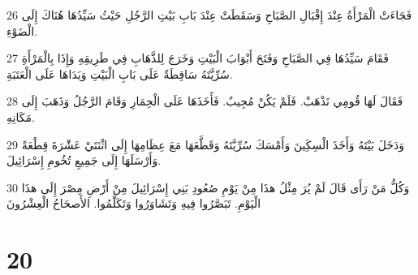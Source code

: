 \par 26 فَجَاءَتْ الْمَرْأَةُ عِنْدَ إِقْبَالِ الصَّبَاحِ وَسَقَطَتْ عِنْدَ بَابِ بَيْتِ الرَّجُلِ حَيْثُ سَيِّدُهَا هُنَاكَ إِلَى الْضَوْءِ.
\par 27 فَقَامَ سَيِّدُهَا فِي الصَّبَاحِ وَفَتَحَ أَبْوَابَ الْبَيْتِ وَخَرَجَ لِلذَّهَابِ فِي طَرِيقِهِ وَإِذَا بِالْمَرْأَةِ سُرِّيَّتَهُ سَاقِطَةٌ عَلَى بَابِ الْبَيْتِ وَيَدَاهَا عَلَى الْعَتَبَةِ.
\par 28 فَقَالَ لَهَا قُومِي نَذْهَبْ. فَلَمْ يَكُنْ مُجِيبٌ. فَأَخَذَهَا عَلَى الْحِمَارِ وَقَامَ الرَّجُلُ وَذَهَبَ إِلَى مَكَانِهِ.
\par 29 وَدَخَلَ بَيْتَهُ وَأَخَذَ الْسِكَِينَ وَأَمْسَكَ سُرِّيَّتَهُ وَقَطَّعَهَا مَعَ عِظَامِهَا إِلَى اثْنَتَيْ عَشَْرَةَ قِطْعَةً وَأَرْسَلَهَا إِلَى جَمِيعِ تُخُومِ إِسْرَائِيلَ.
\par 30 وَكُلُّ مَنْ رَأَى قَالَ لَمْ يُرَ مِثْلُ هذَا مِنْ يَوْمِ صُعُودِ بَنِي إِسْرَائِيلَ مِنْ أَرْضِ مِصْرَ إِلَى هذَا الْيَوْمِ. تَبَصَّرُوا فِيهِ وَتَشَاوَرُوا وَتَكَلَّمُوا. الأَصحَاحُ الْعِشْرُونَ

\chapter{20}

